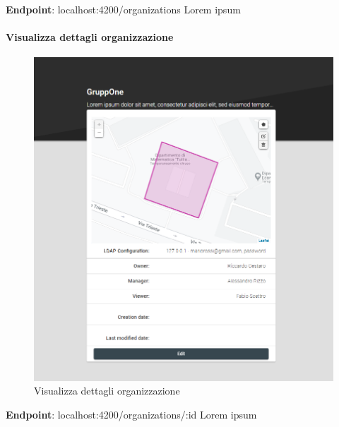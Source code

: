 \documentclass[../manuale-utente.tex]{subfiles}
\begin{document}

\textbf{Endpoint}: localhost:4200/organizations
Lorem ipsum
\newpage

\paragraph{Visualizza dettagli organizzazione}%
\label{par:visualizza-dettagli-organizzazione}

\begin{figure}[H]
    \centering
    \includegraphics[width=120mm]{img/web-app/visualizza-dettagli-organizzazione.png}
    \caption{Visualizza dettagli organizzazione}%
    \label{fig:web-app-visualizza-dettagli-organizzazione}
\end{figure}

\textbf{Endpoint}: localhost:4200/organizations/:id
Lorem ipsum
\newpage

\end{document}
